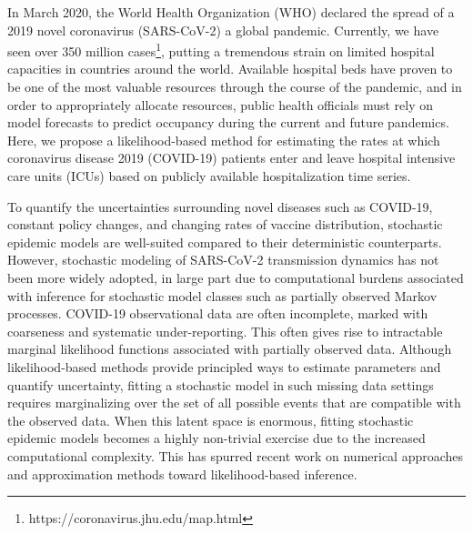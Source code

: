 \documentclass{article}
\begin{document}
In March 2020, the World Health Organization (WHO) declared the spread of a 2019 novel coronavirus (SARS-CoV-2) a global pandemic. Currently, we have seen over 350 million cases\footnote[2]{https://coronavirus.jhu.edu/map.html}, putting a tremendous strain on limited hospital capacities in countries around the world. Available hospital beds have proven to be one of the most valuable resources through the course of the pandemic, and in order to appropriately allocate resources, public health officials must rely on model forecasts to predict  occupancy during the current and future pandemics. \cite{ferstad2020model} Here, we propose a likelihood-based method for estimating the rates at which coronavirus disease 2019 (COVID-19) patients enter and leave hospital intensive care units (ICUs) based on publicly available hospitalization time series.\par

To quantify the uncertainties surrounding novel diseases such as COVID-19, constant policy changes, and changing rates of vaccine distribution, stochastic epidemic models are well-suited compared to their deterministic counterparts. However, stochastic modeling of SARS-CoV-2 transmission dynamics has not been more widely adopted, in large part due to computational burdens associated with inference for stochastic model classes such as partially observed Markov processes. \cite{ionides2006inference,breto2018modeling} COVID-19 observational data are often incomplete, marked with coarseness and systematic under-reporting. This often gives rise to intractable marginal likelihood functions associated with partially observed data. Although likelihood-based methods provide principled ways to estimate parameters and quantify uncertainty, fitting a stochastic model in such missing data settings requires marginalizing over the set of all possible events that are compatible with the observed data. When this latent space is enormous, fitting stochastic epidemic models becomes a highly non-trivial exercise due to the increased computational complexity. \cite{doss2013fitting, xu2015likelihood} This has spurred recent work on numerical approaches and approximation methods toward likelihood-based inference. \cite{crawford2012transition, fearnhead2014inference, ho2018birth, de2020parameter,  FintziWakefieldMinin} \par
\end{document}
